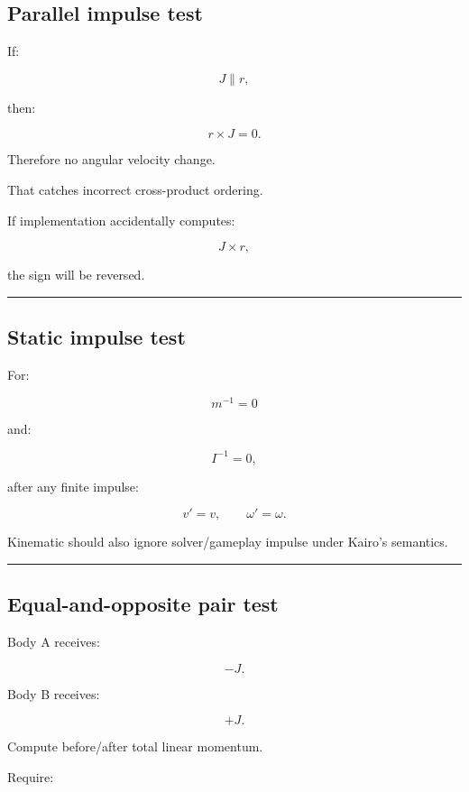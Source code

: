 \subsection{Parallel impulse test}\label{06-engine-ii-ch039-parallel-impulse-test}

If:

\[
J\parallel r,
\]

then:

\[
r\times J=0.
\]

Therefore no angular velocity change.

That catches incorrect cross-product ordering.

If implementation accidentally computes:

\[
J\times r,
\]

the sign will be reversed.

\begin{center}\rule{0.5\linewidth}{0.5pt}\end{center}

\subsection{Static impulse test}\label{06-engine-ii-ch039-static-impulse-test}

For:

\[
m^{-1}=0
\]

and:

\[
I^{-1}=0,
\]

after any finite impulse:

\[
v'=v,
\qquad
\omega'=\omega.
\]

Kinematic should also ignore solver/gameplay impulse under Kairo's semantics.

\begin{center}\rule{0.5\linewidth}{0.5pt}\end{center}

\subsection{Equal-and-opposite pair test}\label{06-engine-ii-ch039-equal-and-opposite-pair-test}

Body A receives:

\[
-J.
\]

Body B receives:

\[
+J.
\]

Compute before/after total linear momentum.

Require:

